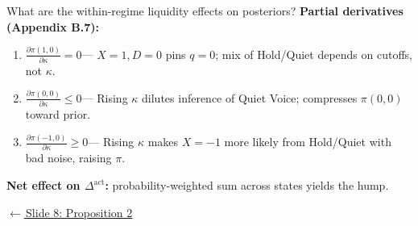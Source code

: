 \documentclass[aspectratio=169,10pt]{beamer}
\newcommand{\1}{\mathbf{1}}
\newcommand{\returnlink}[2]{%
  \par\vspace{0.2em}\hfill{\scriptsize\hyperlink{#1}{\textcolor{brightblue}{$\leftarrow$\,#2}}}%
}
\begin{document}
\begin{frame}{What are the within-regime liquidity effects on posteriors?}
\hypertarget{backup:liquidity_posteriors}{}
\small
\textbf{Partial derivatives (Appendix B.7):}

\vspace{0.2em}

\begin{enumerate}\itemsep0.2em
  \item $\frac{\partial\pi(1,0)}{\partial\kappa} = 0$\;---\;
  {\footnotesize $X{=}1, D{=}0$ pins $q{=}0$; mix of Hold/Quiet depends on cutoffs, not $\kappa$.}

  \item $\frac{\partial\pi(0,0)}{\partial\kappa} \le 0$\;---\;
  {\footnotesize Rising $\kappa$ dilutes inference of Quiet Voice; compresses $\pi(0,0)$ toward prior.}

  \item $\frac{\partial\pi(-1,0)}{\partial\kappa} \ge 0$\;---\;
  {\footnotesize Rising $\kappa$ makes $X{=}{-}1$ more likely from Hold/Quiet with bad noise, raising $\pi$.}
\end{enumerate}

\vspace{0.2em}

{\small\textbf{Net effect on $\Delta^{\text{act}}$:} probability-weighted sum across states yields the hump.}

\returnlink{main:prop2}{Slide 8: Proposition 2}
\end{frame}
\end{document}
